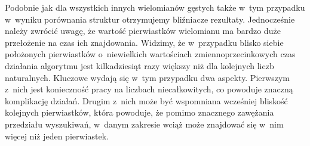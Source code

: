 Podobnie jak dla wszystkich innych wielomianów gęstych także w~tym przypadku w~wyniku porównania struktur otrzymujemy bliźniacze rezultaty. Jednocześnie należy zwrócić uwagę, że wartość pierwiastków wielomianu ma bardzo duże przełożenie na czas ich znajdowania. Widzimy, że w~przypadku blisko siebie położonych pierwiastków o~niewielkich wartościach zmiennoprzecinkowych czas działania algorytmu jest kilkadziesiąt razy większy niż dla kolejnych liczb naturalnych. Kluczowe wydają się w~tym przypadku dwa aspekty. Pierwszym z~nich jest konieczność pracy na liczbach niecałkowitych, co powoduje znaczną komplikację działań. Drugim z~nich może być wspomniana wcześniej bliskość kolejnych pierwiastków, która powoduje, że pomimo znacznego zawężania przedziału wyszukiwań, w~danym zakresie wciąż może znajdować się w~nim więcej niż jeden pierwiastek.
